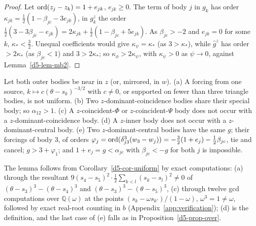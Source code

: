 \begin{proof}
Let $\operatorname{ord}(z_j-z_k)=1+e_{jk}$, $e_{jk}\ge0$.  The term of body $j$ in $g_k$ has order
$\kappa_{jk}=\frac12(1-\beta_{jc}-3e_{jk})$, in $g^z_k$ the order
$\frac12(3-3\beta_{jc}-e_{jk})=2\kappa_{jk}+\frac12(1-\beta_{jc}+5e_{jk})$.  As $\beta_{jc}>-2$ and
$e_{jk}=0$ for some $k$, $\kappa_*<\frac32$.  Unequal coefficients would give $\kappa_\psi=\kappa_*$
(as $3>\kappa_*$), while $\hat g^z$ has order $>2\kappa_*$ (as $\beta_{jc}<1$) and $3>2\kappa_*$; so
$\kappa_\phi>2\kappa_\psi$, with $\kappa_\psi>0$ as $\psi\to0$, against Lemma~\ref{d5-lem-mb2}.
\end{proof}

\begin{lemma}\label{d5-lem-consequences}
Let both outer bodies be near in $z$ (or, mirrored, in $w$).  (a) A forcing from one source,
$k\mapsto c(\theta-s_k)^{-3/2}$ with $c\ne0$, or supported on fewer than three triangle bodies, is
not uniform.  (b) Two $z$-dominant-coincidence bodies share their special body; so
$\alpha_{12}>1$.  (c) A $z$-coincident-$\Phi$ or $z$-coincident-$\Psi$ body does not occur with a
$z$-dominant-coincidence body.  (d) A $z$-inner body does not occur with a $z$-dominant-central
body.  (e) Two $z$-dominant-central bodies have the same $g$; their forcings of body $3$, of orders
$\varphi_j=\operatorname{ord}(\delta_{j3}^3(w_3-w_j))=-\frac32(1+e_j)-\frac12\beta_{jc}$, tie and cancel;
$g>3+\varphi_1$; and $1+e_j=g<\alpha_{jc}$ with $\beta_{jc}<-g$ for both $j$ is impossible.
\end{lemma}
The lemma follows from Corollary~\ref{d5-cor-uniform} by exact computations:
(a) through the resultant $9(s_4-s_5)^2\cdot\frac12\sum_{k<l}(s_k-s_l)^2\ne0$ of
$(\theta-s_3)^3-(\theta-s_4)^3$ and $(\theta-s_3)^3-(\theta-s_5)^3$, (c) through twelve gcd
computations over $\mathbb Q(\omega)$ at the points $(s_k-\omega s_{k'})/(1-\omega)$,
$\omega^3=1\ne\omega$, followed by exact real-root counting in $b$ (Appendix~\ref{app:verification});
(d) is the definition, and the last case of (e) falls as in Proposition~\ref{d5-prop-over}.

